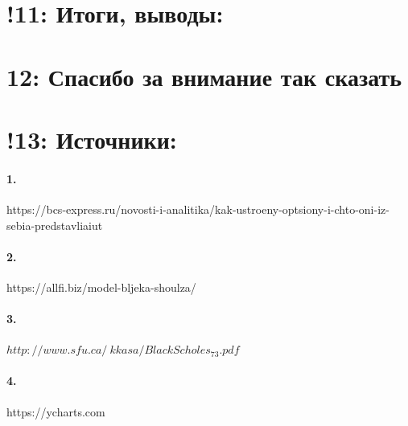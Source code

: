 \documentclass[a4paper]{article}
\begin{document}
\section*{!11: Итоги, выводы:}
\section*{12: Спасибо за внимание так сказать}
\section*{!13: Источники:}
\paragraph*{1.}
https://bcs-express.ru/novosti-i-analitika/kak-ustroeny-optsiony-i-chto-oni-iz-sebia-predstavliaiut
\paragraph*{2.}
https://allfi.biz/model-bljeka-shoulza/
\paragraph*{3.}
$http://www.sfu.ca/~kkasa/BlackScholes_73.pdf$
\paragraph*{4.}
https://ycharts.com
\end{document}
